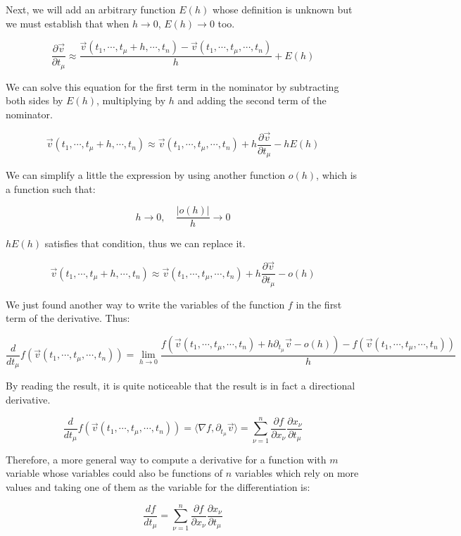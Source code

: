 \documentclass[12pt]{article}
\begin{document}
	Next, we will add an arbitrary function $E(h)$ whose definition is unknown but we must establish that when $h \to 0$, $E(h) \to 0$ too.
	
	\[
		\frac{\partial \vec{v}}{\partial t_\mu}
		\approx \frac{\vec{v}(t_1, \cdots, t_\mu + h, \cdots, t_n) - \vec{v}(t_1, \cdots, t_\mu, \cdots, t_n)}{h} + E(h)
	\]
	
	We can solve this equation for the first term in the nominator by subtracting both sides by $E(h)$, multiplying by $h$ and adding the second term of the nominator.
	
	\[
		\vec{v}(t_1, \cdots, t_\mu + h, \cdots, t_n)
		\approx \vec{v}(t_1, \cdots, t_\mu, \cdots, t_n) + h \frac{\partial \vec{v}}{\partial t_\mu} - hE(h)
	\]
	
	We can simplify a little the expression by using another function $o(h)$, which is a function such that:
	
	\[
		h \to 0, \quad \frac{|o(h)|}{h} \to 0
	\]
	
	$hE(h)$ satisfies that condition, thus we can replace it.
	
	\[
		\vec{v}(t_1, \cdots, t_\mu + h, \cdots, t_n)
		\approx \vec{v}(t_1, \cdots, t_\mu, \cdots, t_n) + h \frac{\partial \vec{v}}{\partial t_\mu} - o(h)
	\]
	
	We just found another way to write the variables of the function $f$ in the first term of the derivative. Thus:
	
	
	\[
		\frac{d}{dt_\mu}f(\vec{v}(t_1, \cdots, t_\mu, \cdots, t_n))
		= \lim_{h \to 0} \frac{f(\vec{v}(t_1, \cdots, t_\mu, \cdots, t_n) + h \partial_{t_\mu} \vec{v} - o(h)) - f(\vec{v}(t_1, \cdots, t_\mu, \cdots, t_n))}{h}
	\]
	
	By reading the result, it is quite noticeable that the result is in fact a directional derivative.
	
	\[
		\frac{d}{dt_\mu}f(\vec{v}(t_1, \cdots, t_\mu, \cdots, t_n))
		= \langle \nabla f, \partial_{t_\mu} \vec{v} \rangle
		= \sum_{\nu = 1}^n \frac{\partial f}{\partial x_\nu} \frac{\partial x_\nu}{\partial t_\mu}
	\]
	
	Therefore, a more general way to compute a derivative for a function with $m$ variable whose variables could also be functions of $n$ variables which rely on more values and taking one of them as the variable for the differentiation is:
	
	\[
		\frac{df}{dt_\mu}
		= \sum_{\nu = 1}^n \frac{\partial f}{\partial x_\nu} \frac{\partial x_\nu}{\partial t_\mu}
	\]
	
\end{document}
